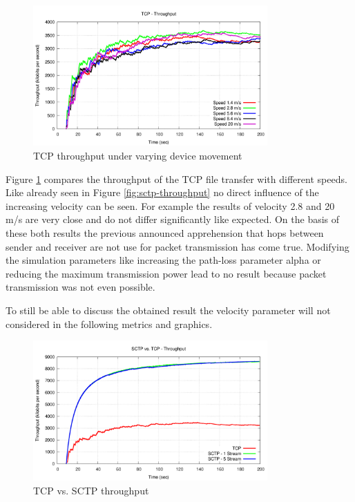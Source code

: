 \documentclass[a4paper]{article}
\begin{document}
\begin{figure}[H]
	\centering
	\includegraphics[width=0.8\textwidth]{imgs/tcp-throughput.png}
	\caption{TCP throughput under varying device movement}
	\label{fig:tcp-throughput}
\end{figure}

Figure \ref{fig:tcp-throughput} compares the throughput of the TCP file transfer with different speeds. Like already seen in Figure \ref{fig:sctp-throughput} no direct influence of the increasing velocity can be seen. For example the results of velocity 2.8 and 20 m/s are very close and do not differ significantly like expected. On the basis of these both results the previous announced apprehension that hops between sender and receiver are not use for packet transmission has come true. Modifying the simulation parameters like increasing the path-loss parameter alpha or reducing the maximum transmission power lead to no result because packet transmission was not even possible.

To still be able to discuss the obtained result the velocity parameter will not considered in the following metrics and graphics.

\begin{figure}[H]
	\centering
	\includegraphics[width=0.8\textwidth]{imgs/sctp-vs-tcp-throughput.png}
	\caption{TCP vs. SCTP throughput}
	\label{fig:tcp-vs-sctp-throughput}
\end{figure}
\end{document}
